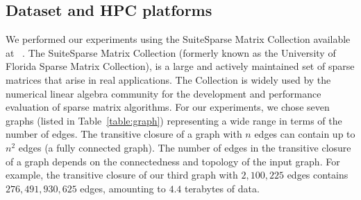 

\subsection{Dataset and HPC platforms}
\label{sec:datasets}
We performed our experiments using the SuiteSparse Matrix Collection available at ~\cite{Davis:2011:UFS:2049662.2049663}.
The SuiteSparse Matrix Collection (formerly known as the University of Florida Sparse Matrix Collection), is a large and actively maintained set of sparse matrices that arise in real applications. The Collection is widely used by the numerical linear algebra community for the development and performance evaluation of sparse matrix algorithms. 
For our experiments, we chose seven graphs (listed in Table~\ref{table:graph}) representing a wide range in terms of the number of edges.
The transitive closure of a graph with $n$ edges can contain up to $n^2$ edges (a fully connected graph). The number of edges in the transitive closure of a graph depends on the connectedness and topology of the input graph. For example, the transitive closure of our third graph with $2,\!100,\!225$ edges contains $276,\!491,\!930,\!625$ edges, amounting to $4.4$ terabytes of data.


